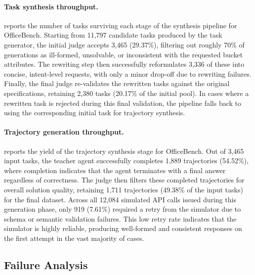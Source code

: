 \paragraph{Task synthesis throughput.}
 reports the number of tasks surviving each stage of the synthesis pipeline for OfficeBench. Starting from 11,797 candidate tasks produced by the task generator, the initial judge accepts 3,465 (29.37\%), filtering out roughly 70\% of generations as ill-formed, unsolvable, or inconsistent with the requested bucket attributes. The rewriting step then successfully reformulates 3,336 of these into concise, intent-level requests, with only a minor drop-off due to rewriting failures. Finally, the final judge re-validates the rewritten tasks against the original specifications, retaining 2,380 tasks (20.17\% of the initial pool). 
In cases where a rewritten task is rejected during this final validation, the pipeline falls back to using the corresponding initial task for trajectory synthesis.



\paragraph{Trajectory generation throughput.}
 reports the yield of the trajectory synthesis stage for OfficeBench. Out of 3,465 input tasks, the teacher agent successfully completes 1,889 trajectories (54.52\%), where completion indicates that the agent terminates with a final answer regardless of correctness. The judge then filters these completed trajectories for overall solution quality, retaining 1,711 trajectories (49.38\% of the input tasks) for the final dataset. Across all 12,084 simulated API calls issued during this generation phase, only 919 (7.61\%) required a retry from the simulator due to schema or semantic validation failures. This low retry rate indicates that the simulator is highly reliable, producing well-formed and consistent responses on the first attempt in the vast majority of cases.



\subsection{Failure Analysis}


